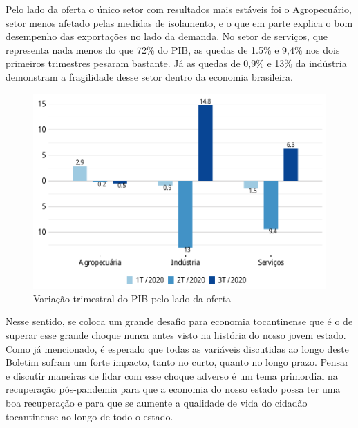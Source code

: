 \par Pelo lado da oferta o único setor com resultados mais estáveis foi o Agropecuário, setor menos afetado pelas medidas de isolamento, e o que em parte explica o bom desempenho das exportações no lado da demanda. No setor de serviços, que representa nada menos do que 72\% do PIB, as quedas de 1.5\% e 9,4\% nos dois primeiros trimestres pesaram bastante. Já as quedas de 0,9\% e 13\% da indústria demonstram a fragilidade desse setor dentro da economia brasileira.
\begin{figure}[h]
	\caption{Variação trimestral do PIB pelo lado da oferta}
	\includegraphics{fig/pib_oferta.pdf}
\end{figure}
\par Nesse sentido, se coloca um grande desafio para economia tocantinense que é o de superar esse grande choque nunca antes visto na história do nosso jovem estado. Como já mencionado, é esperado que todas as variáveis discutidas ao longo deste Boletim sofram um forte impacto, tanto no curto, quanto no longo prazo. Pensar e discutir maneiras de lidar com esse choque adverso é um tema primordial na recuperação pós-pandemia para que a economia do nosso estado possa ter uma boa recuperação e para que se aumente a qualidade de vida do cidadão tocantinense ao longo de todo o estado. 
